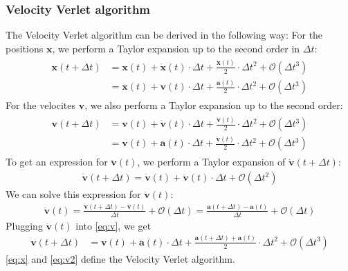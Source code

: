 \documentclass[a4paper,10pt,bibtotoc]{scrartcl}
\begin{document}
\subsubsection{Velocity Verlet algorithm}
The Velocity Verlet algorithm can be derived in the following way: For the positions $\mathbf{x}$, we perform a Taylor expansion up to the second order in $\Delta t$:
\begin{align}
\begin{split}
 \mathbf{x}(t + \Delta t) &= \mathbf{x}(t) + \dot{\mathbf{x}}(t)\cdot \Delta t + \frac{\ddot{\mathbf{x}}(t)}{2}\cdot \Delta t^2 + \mathcal{O}(\Delta t^3)\\
 &= \mathbf{x}(t) + \mathbf{v}(t)\cdot \Delta t + \frac{\mathbf{a}(t)}{2}\cdot \Delta t^2 + \mathcal{O}(\Delta t^3)
 \end{split}
 \label{eq:x}
\end{align}
For the velocites $\mathbf{v}$, we also perform a Taylor expansion up to the second order:
\begin{align}
\begin{split}
 \mathbf{v}(t + \Delta t) &= \mathbf{v}(t) + \dot{\mathbf{v}}(t)\cdot \Delta t + \frac{\ddot{\mathbf{v}}(t)}{2}\cdot \Delta t^2 + \mathcal{O}(\Delta t^3)\\
 &=\mathbf{v}(t) + \mathbf{a}(t)\cdot \Delta t + \frac{\ddot{\mathbf{v}}(t)}{2}\cdot \Delta t^2 + \mathcal{O}(\Delta t^3)
\end{split}
 \label{eq:v}
\end{align}
To get an expression for $\ddot{\mathbf{v}}(t)$, we perform a Taylor expansion of $\dot{\mathbf{v}}(t + \Delta t)$:
\begin{align}
 \dot{\mathbf{v}}(t + \Delta t) = \dot{\mathbf{v}}(t) + \ddot{\mathbf{v}}(t)\cdot \Delta t + \mathcal{O}(\Delta t^2)
\end{align}
We can solve this expression for $\ddot{\mathbf{v}}(t)$:
\begin{align}
 \ddot{\mathbf{v}}(t) = \frac{\dot{\mathbf{v}}(t+\Delta t) - \dot{\mathbf{v}}(t)}{\Delta t} + \mathcal{O}(\Delta t) = \frac{\mathbf{a}(t+\Delta t) - \mathbf{a}(t)}{\Delta t} + \mathcal{O}(\Delta t)
\end{align}
Plugging $\ddot{\mathbf{v}}(t)$ into \autoref{eq:v}, we get
\begin{align}
 \mathbf{v}(t + \Delta t) &=\mathbf{v}(t) + \mathbf{a}(t)\cdot \Delta t + \frac{\mathbf{a}(t+\Delta t) + \mathbf{a}(t)}{2} \cdot\Delta t^2 + \mathcal{O}(\Delta t^3)
 \label{eq:v2}
\end{align}
\autoref{eq:x} and \autoref{eq:v2} define the Velocity Verlet algorithm.
\end{document}
